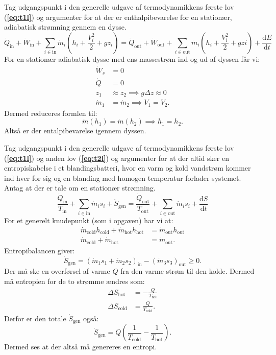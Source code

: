 \documentclass[a4paper]{article}
\begin{document}
Tag udgangspunkt i den generelle udgave af termodynamikkens første lov (\textbf{\autoref{eq:t1l}}) og argumenter for at der er enthalpibevarelse for en stationær, adiabatisk strømning gennem en dysse.
\begin{equation}\label{eq:t1l}
  \dot{Q}_{\mathrm{in}} + \dot{W}_{\mathrm{in}} + \sum_{i \in \mathrm{in}} \dot{m}_i \left( h_i + \frac{V_i^2}{2} + gz_i \right) = \dot{Q}_{\mathrm{out}} + \dot{W}_{\mathrm{out}} + \sum_{i \in \mathrm{out}} \dot{m}_i \left( h_i + \frac{V_i^2}{2} + gzi \right) + \frac{\mathrm{d}E}{\mathrm{d}t} 
\end{equation}
For en stationær adiabatisk dysse med ens massestrøm ind og ud af dyssen får vi:
\begin{align*}
  \dot{W}_s &= 0 \\
  \dot{Q} &= 0 \\
  z_1 &\approx z_2 \implies g \Delta z \approx 0 \\
  \dot{m}_1 &= \dot{m}_2 \implies V_1 = V_2
.\end{align*}
Dermed reduceres formlen til:
\[ 
\dot{m} \left( h_1 \right) = \dot{m} \left( h_2 \right) \implies h_1= h_2
.\]
Altså er der entalpibevarelse igennem dyssen.

Tag udgangspunkt i den generelle udgave af termodynamikkens første lov (\textbf{\autoref{eq:t1l}}) og anden lov (\textbf{\autoref{eq:t2l}}) og argumenter for at der altid sker en entropiskabelse i et blandingsbatteri, hvor en varm og kold vandstrøm kommer ind hver for sig og en blanding med homogen temperatur forlader systemet. Antag at der er tale om en stationær strømning.
\begin{equation} \label{eq:t2l}  
  \frac{\dot{Q}_{\mathrm{in}}}{T_{\mathrm{in}}} + \sum_{i \in \mathrm{in}} \dot{m}_i s_i + \dot{S}_{\mathrm{gen}} = \frac{\dot{Q}_{\mathrm{out}}}{T_{\mathrm{out}}} + \sum_{i \in \mathrm{out}} \dot{m}_i s_i + \frac{\mathrm{d}S}{\mathrm{d}t} 
\end{equation}
\bigbreak
For et generelt knudepunkt (som i opgaven) har vi at:
\begin{align*}
  \dot{m}_{\mathrm{cold}} h_{\mathrm{cold}} + \dot{m}_{\mathrm{hot}} h_{\mathrm{hot}} &= \dot{m}_{\mathrm{out}} h_{\mathrm{out}} \\
  \dot{m}_{\mathrm{cold}} + \dot{m}_{\mathrm{hot}} &= \dot{m}_{\mathrm{out}}
.\end{align*}
Entropibalancen giver:
\[ 
\dot{S}_{\mathrm{gen}} = \left( \dot{m}_1 s_1 + \dot{m}_2 s_2 \right)_{\mathrm{in}} - \left( \dot{m}_3 s_3 \right)_{\mathrm{out}} \geq 0
.\]
Der må ske en overførsel af varme $Q$ fra den varme strøm til den kolde. Dermed må entropien for de to strømme ændres som:
\begin{align*}
  \Delta S_{\mathrm{hot}} &= - \frac{Q}{T_{\mathrm{hot}}} \\
  \Delta S_{\mathrm{cold}} &= \frac{Q}{T_{\mathrm{cold}}}
.\end{align*}
Derfor er den totale $\dot{S}_{\mathrm{gen}}$ også:
\[ 
\dot{S}_{\mathrm{gen}} = Q \left( \frac{1}{T_{\mathrm{cold}}} - \frac{1}{T_{\mathrm{hot}}} \right)
.\]
Dermed ses at der altså må genereres en entropi. 
\end{document}
